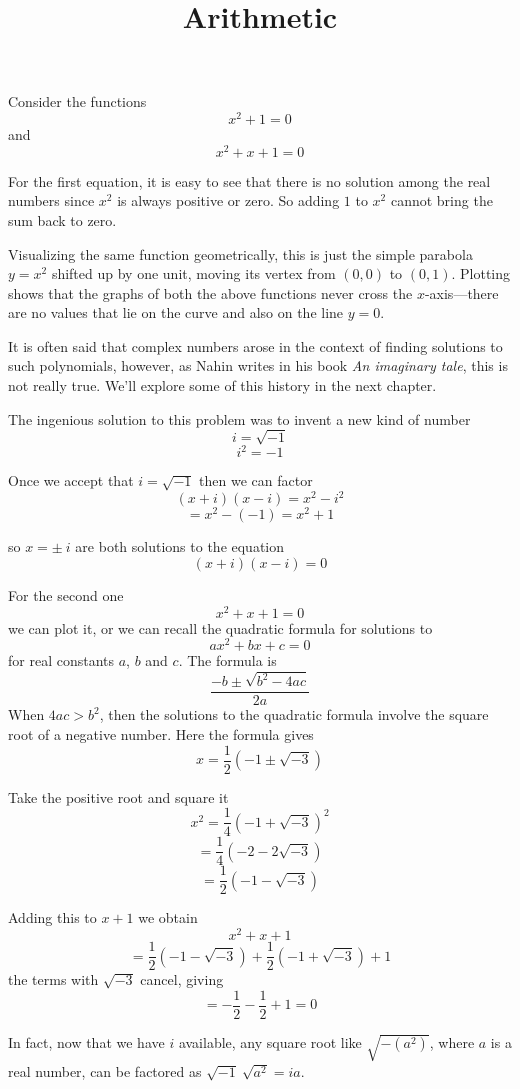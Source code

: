 \documentclass[11pt, oneside]{article}
\title{Arithmetic}
\date{}
\begin{document}
\maketitle
\Large


Consider the functions
\[ x^2 + 1 = 0 \]
and
\[ x^2 + x + 1 = 0 \]

For the first equation, it is easy to see that there is no solution among the real numbers since $x^2$ is always positive or zero.  So adding $1$ to $x^2$ cannot bring the sum back to zero.

Visualizing the same function geometrically, this is just the simple parabola $y=x^2$ shifted up by one unit, moving its vertex from $(0,0)$ to $(0,1)$.  Plotting shows that the graphs of both the above functions never cross the $x$-axis---there are no values that lie on the curve and also on the line $y=0$.

It is often said that complex numbers arose in the context of finding solutions to such polynomials, however, as Nahin writes in his book \emph{An imaginary tale}, this is not really true.  We'll explore some of this history in the next chapter.

The ingenious solution to this problem was to invent a new kind of number
\[ i = \sqrt{-1} \]
\[ i^2 = -1 \]

Once we accept that $i = \sqrt{-1}$
then we can factor
\[ (x + i)(x - i) = x^2 - i^2 \]
\[ = x^2 - (-1) = x^2 + 1 \]

so $x = \pm \ i$ are both solutions to the equation 
\[ (x + i)(x - i) = 0 \]

For the second one
\[ x^2 + x + 1 = 0 \]
we can plot it, or we can recall the quadratic formula for solutions to
\[ ax^2 + bx + c = 0 \]
for real constants $a$, $b$ and $c$.  The formula is
\[ \frac{-b \pm \sqrt{b^2 - 4ac}}{2a} \]
When $4ac > b^2$, then the solutions to the quadratic formula involve the square root of a negative number.  Here the formula gives
\[ x = \frac{1}{2} (-1 \pm \sqrt{-3}) \]

Take the positive root and square it
\[ x^2 = \frac{1}{4} (-1 + \sqrt{-3})^2 \]
\[ = \frac{1}{4} (-2 - 2 \sqrt{-3}) \]
\[ =  \frac{1}{2} (-1 - \sqrt{-3})  \]

Adding this to $x+1$ we obtain
\[ x^2 + x + 1 \]
\[ = \frac{1}{2} (-1 - \sqrt{-3}) +  \frac{1}{2} (-1 + \sqrt{-3}) + 1 \]
the terms with $\sqrt{-3}$ cancel, giving
\[ = -\frac{1}{2} - \frac{1}{2} + 1 = 0 \]

In fact, now that we have $i$ available, any square root like $\sqrt{-(a^2)}$, where $a$ is a real number, can be factored as $\sqrt{-1} \ \sqrt{a^2} = ia$.
\end{document}
